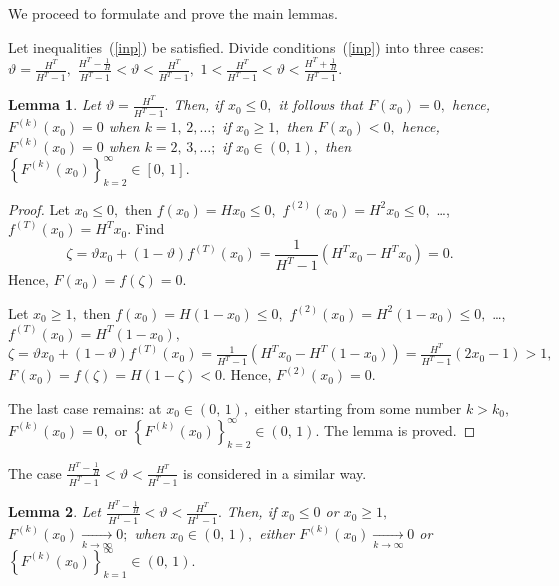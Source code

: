 \documentclass[12pt,a4paper]{amsart}
\newtheorem{lemma}{Lemma}
\begin{document}
We proceed to formulate and prove the main lemmas.

Let inequalities~(\ref{inp}) be satisfied. Divide conditions~(\ref{inp}) into three cases: $\vartheta=\frac{H^T}{H^T-1},$
$\frac{H^T-\frac{1}{H}}{H^T-1}<\vartheta<\frac{H^T}{H^T-1},$ $1<\frac{H^T}{H^T-1}<\vartheta<\frac{H^T+\frac{1}{H}}{H^T-1}.$

\begin{lemma}\label{l2}
Let $\vartheta=\frac{H^T}{H^T-1}.$ Then, if $x_0\leq 0,$ it follows that $F(x_0)=0,$ hence, $F^{(k)}(x_0)=0$ when $k=1,\,2,\ldots;$
if $x_0\geq 1,$ then $F(x_0)<0,$ hence, $F^{(k)}(x_0)=0$ when $k=2,\,3,\ldots;$ if $x_0\in(0,\,1),$ then 
$\left\{F^{(k)}(x_0)\right\}_{k=2}^{\infty}\in[0,\,1].$  
\end{lemma}

\begin{proof}
Let $x_0\leq 0,$ then $f(x_0)=Hx_0\leq 0,$ $f^{(2)}(x_0)=H^2 x_0\leq 0,$ \ldots, $f^{(T)}(x_0)=H^T x_0.$  Find 
$$
\zeta=\vartheta x_0 + (1-\vartheta)f^{(T)}(x_0)=\frac{1}{H^T-1}\left(H^T x_0 - H^T x_0\right)=0.
$$ 
Hence, $F(x_0)=f(\zeta)=0.$

Let $x_0\geq 1,$ then $f(x_0)=H (1-x_0)\leq 0,$ $f^{(2)}(x_0)=H^2 (1-x_0)\leq 0,$ \ldots, $f^{(T)}(x_0)=H^T (1-x_0),$
$\zeta=\vartheta x_0 + (1-\vartheta)f^{(T)}(x_0)=\frac{1}{H^T-1}\left(H^T x_0 - H^T (1-x_0)\right)=\frac{H^T}{H^T-1}(2x_0-1)>1,$
$F(x_0)=f(\zeta)=H(1-\zeta)<0.$ Hence, $F^{(2)}(x_0)=0.$ 

The last case remains: at $x_0\in(0,\,1),$ either starting from some number $k>k_0,$  $F^{(k)}(x_0)=0,$ or 
$\left\{F^{(k)}(x_0)\right\}_{k=2}^{\infty}\in(0,\,1).$ The lemma is proved.
\end{proof}

The case $\frac{H^T-\frac{1}{H}}{H^T-1}<\vartheta<\frac{H^T}{H^T-1}$ is considered in a similar way.

\begin{lemma}\label{l3}
Let $\frac{H^T-\frac{1}{H}}{H^T-1}<\vartheta<\frac{H^T}{H^T-1}.$ Then, if $x_0\leq 0$ or $x_0\geq 1,$ 
${F^{(k)}(x_0)\xrightarrow[k\rightarrow\infty]{}0;}$ when $x_0\in(0,\,1),$ either $F^{(k)}(x_0)\xrightarrow[k\rightarrow\infty]{}0$
or $\left\{F^{(k)}(x_0)\right\}_{k=1}^{\infty}\in(0,\,1).$
\end{lemma}
\end{document}
